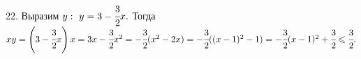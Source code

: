 22. Выразим $y:\ y=3-\cfrac{3}{2}x.$ Тогда $xy=\left(3-\cfrac{3}{2}x\right)x=3x-\cfrac{3}{2}x^2=-\cfrac{3}{2}(x^2-2x)=
-\cfrac{3}{2}((x-1)^2-1)=-\cfrac{3}{2}(x-1)^2+\cfrac{3}{2}\leqslant\cfrac{3}{2}.$\\

